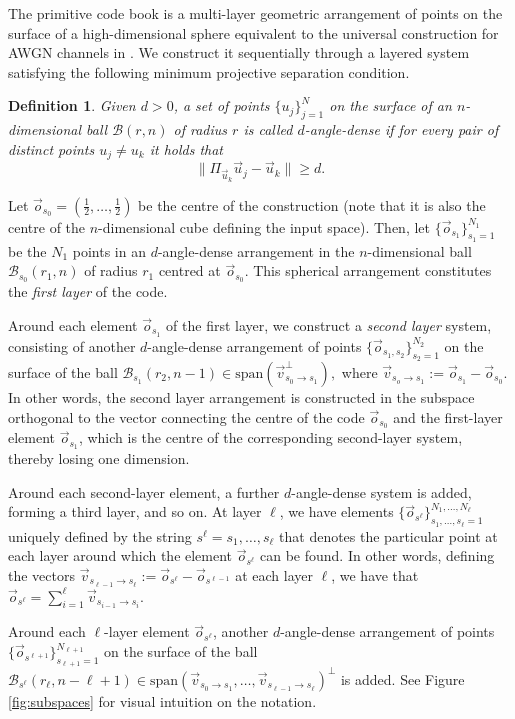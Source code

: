 \documentclass[10pt, conference]{IEEEtran}
\newtheorem{definition}[theorem]{Definition}
\newcommand{\1}{\mathds{1}}
\newcommand{\cB}{\mathcal{B}}
\begin{document}
The primitive code book is a multi-layer geometric arrangement of points on the surface of a high-dimensional sphere equivalent to the universal construction for AWGN channels in \cite{CDBW:Gauss}. We construct it sequentially through a layered system satisfying the following minimum projective separation condition.

\begin{definition}\label{def:angle-dense}
Given $d>0$, a set of points $\{u_j\}_{j=1}^{N}$ on the surface of an $n$-dimensional ball $\cB(r,n)$ of radius $r$ is called $d$-\emph{angle-dense} if for every pair of distinct points $u_j\neq u_k$ it holds that
\[
\|\Pi_{\vec{u}_k}\vec{u}_j-\vec{u}_k\|\geq d.
\]
\end{definition}

Let $\vec o_{s_0}=(\frac12,\dots,\frac12)$ be the centre of the construction (note that it is also the centre of the $n$-dimensional cube defining the input space). Then, let $\{\vec o_{s_1}\}_{s_1=1}^{N_1}$ be the $N_1$ points in an $d$-angle-dense arrangement in the $n$-dimensional ball $\cB_{s_0}(r_1,n)$ of radius $r_1$ centred at $\vec o_{s_0}$. This spherical arrangement constitutes the \emph{first layer} of the code. 

Around each element $\vec o_{s_1}$ of the first layer, we construct a \emph{second layer} system, consisting of another $d$-angle-dense arrangement of points $\{\vec o_{s_1,s_2}\}_{s_2=1}^{N_2}$ on the surface of the ball 
\(
\cB_{s_1}(r_2,n-1)\in\text{span}(\vec v_{s_0\to s_1}^\perp),
\)
where $\vec v_{s_o\to s_1}:=\vec o_{s_1}-\vec o_{s_0}$. In other words, the second layer arrangement is constructed in the subspace orthogonal to the vector connecting the centre of the code $\vec o_{s_0}$ and the first-layer element $\vec o_{s_1}$, which is the centre of the corresponding second-layer system, thereby losing one dimension.

Around each second-layer element, a further $d$-angle-dense system is added, forming a third layer, and so on. At layer $\ell$, we have elements $\{\vec o_{s^\ell}\}_{s_1,\dots,s_\ell=1}^{N_1,\dots, N_\ell}$ uniquely defined by the string $s^\ell=s_1,\dots,s_\ell$ that denotes the particular point at each layer around which the element $\vec o_{s^\ell}$ can be found. In other words, defining the vectors $\vec v_{s_{\ell-1}\to s_\ell}:=\vec o_{s^\ell}-\vec o_{s^{\ell-1}}$ at each layer $\ell$, we have that 
\(
    \vec o_{s^\ell}=\sum_{i=1}^\ell\vec v_{s_{i-1}\to s_{i}}.
\)

Around each $\ell$-layer element $\vec o_{s^\ell}$, another $d$-angle-dense arrangement of points $\{\vec o_{s^{\ell+1}}\}_{s_{\ell+1}=1}^{N_{\ell+1}}$ on the surface of the ball 
\(
\cB_{s^\ell}(r_\ell,n-\ell+1)\in\text{span}(\vec v_{s_0\to s_1},\dots,\vec v_{s_{\ell-1}\to s_\ell})^\perp
\)
is added. See Figure \ref{fig:subspaces} for visual intuition on the notation. 
\end{document}
